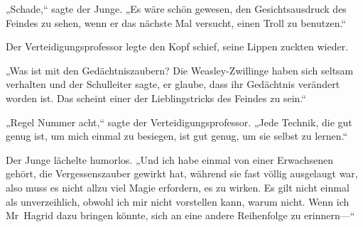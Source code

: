 „Schade,“ sagte der Junge. „Es wäre schön gewesen, den Gesichtsausdruck des Feindes zu sehen, wenn er das nächste Mal versucht, einen Troll zu benutzen.“

Der Verteidigungsprofessor legte den Kopf schief, seine Lippen zuckten wieder.

„Was ist mit den Gedächtniszaubern? Die Weasley-Zwillinge haben sich seltsam verhalten und der Schulleiter sagte, er glaube, dass ihr Gedächtnis verändert worden ist. Das scheint einer der Lieblingstricks des Feindes zu sein.“

„Regel Nummer acht,“ sagte der Verteidigungsprofessor. „Jede Technik, die gut genug ist, um mich einmal zu besiegen, ist gut genug, um sie selbst zu lernen.“

Der Junge lächelte humorlos.
„Und ich habe einmal von einer Erwachsenen gehört, die Vergessenszauber gewirkt hat, während sie fast völlig ausgelaugt war, also muss es nicht allzu viel Magie erfordern, es zu wirken. Es gilt nicht einmal als unverzeihlich, obwohl ich mir nicht vorstellen kann, warum nicht. Wenn ich Mr~Hagrid dazu bringen könnte, sich an eine andere Reihenfolge zu erinnern—“

